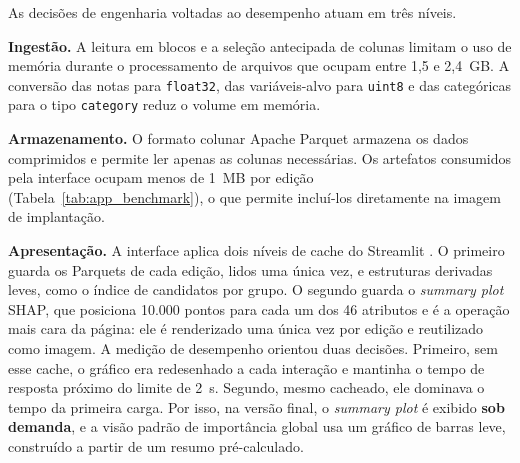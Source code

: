 As decisões de engenharia voltadas ao desempenho atuam em três níveis.

\textbf{Ingestão.} A leitura em blocos e a seleção antecipada de colunas limitam o uso de memória durante o processamento de arquivos que ocupam entre 1,5 e 2,4~GB. A conversão das notas para \texttt{float32}, das variáveis-alvo para \texttt{uint8} e das categóricas para o tipo \texttt{category} reduz o volume em memória.

\textbf{Armazenamento.} O formato colunar Apache Parquet \cite{parquet2026} armazena os dados comprimidos e permite ler apenas as colunas necessárias. Os artefatos consumidos pela interface ocupam menos de 1~MB por edição (Tabela~\ref{tab:app_benchmark}), o que permite incluí-los diretamente na imagem de implantação.

\textbf{Apresentação.} A interface aplica dois níveis de cache do Streamlit \cite{streamlit2026}. O primeiro guarda os Parquets de cada edição, lidos uma única vez, e estruturas derivadas leves, como o índice de candidatos por grupo. O segundo guarda o \textit{summary plot} SHAP, que posiciona 10.000 pontos para cada um dos 46 atributos e é a operação mais cara da página: ele é renderizado uma única vez por edição e reutilizado como imagem. A medição de desempenho orientou duas decisões. Primeiro, sem esse cache, o gráfico era redesenhado a cada interação e mantinha o tempo de resposta próximo do limite de 2~s. Segundo, mesmo cacheado, ele dominava o tempo da primeira carga. Por isso, na versão final, o \textit{summary plot} é exibido \textbf{sob demanda}, e a visão padrão de importância global usa um gráfico de barras leve, construído a partir de um resumo pré-calculado.


